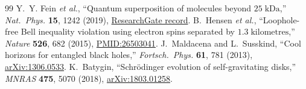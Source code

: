 \documentclass[11pt,letterpaper]{article}
\begin{document}
\begin{thebibliography}{99}
 Y.~Y. Fein \emph{et al.}, ``Quantum superposition of molecules beyond $25\;\mathrm{kDa}$,'' \emph{Nat.\ Phys.} \textbf{15}, 1242 (2019), \href{https://www.researchgate.net/publication/335990763_Quantum_superposition_of_molecules_beyond_25_kDa}{ResearchGate record}.
 B.~Hensen \emph{et al.}, ``Loophole-free Bell inequality violation using electron spins separated by $1.3\;\mathrm{kilometres}$,'' \emph{Nature} \textbf{526}, 682 (2015), \href{https://pubmed.ncbi.nlm.nih.gov/26503041/}{PMID:26503041}.
 J.~Maldacena and L.~Susskind, ``Cool horizons for entangled black holes,'' \emph{Fortsch.\ Phys.} \textbf{61}, 781 (2013), \href{https://arxiv.org/abs/1306.0533}{arXiv:1306.0533}.
 K.~Batygin, ``Schr\"odinger evolution of self-gravitating disks,'' \emph{MNRAS} \textbf{475}, 5070 (2018), \href{https://arxiv.org/abs/1803.01258}{arXiv:1803.01258}.
\end{thebibliography}
\end{document}

